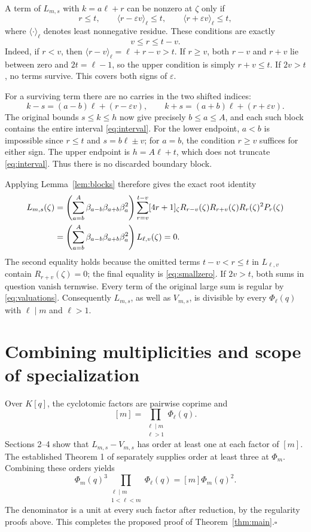 \documentclass[11pt,a4paper]{article}
\begin{document}
A term of $L_{m,s}$ with $k=a\ell+r$ can be nonzero at $\zeta$ only if
\[
 r\leq t,\qquad \langle r-\varepsilon v\rangle_\ell\leq t,
 \qquad \langle r+\varepsilon v\rangle_\ell\leq t,
\]
where $\langle\cdot\rangle_\ell$ denotes least nonnegative residue.
These conditions are exactly
\begin{equation}\label{eq:interval}
 v\leq r\leq t-v.
\end{equation}
Indeed, if $r<v$, then $\langle r-v\rangle_\ell=\ell+r-v>t$.
If $r\geq v$, both $r-v$ and $r+v$ lie between zero and $2t=\ell-1$,
so the upper condition is simply $r+v\leq t$. If $2v>t$, no terms survive.
This covers both signs of $\varepsilon$.

For a surviving term there are no carries in the two shifted indices:
\[
 k-s=(a-b)\ell+(r-\varepsilon v),\qquad
 k+s=(a+b)\ell+(r+\varepsilon v).
\]
The original bounds $s\leq k\leq h$ now give precisely $b\leq a\leq A$,
and each such block contains the entire interval \eqref{eq:interval}.
For the lower endpoint, $a<b$ is impossible since $r\leq t$ and
$s=b\ell\pm v$; for $a=b$, the condition $r\geq v$ suffices for either
sign. The upper endpoint is $h=A\ell+t$, which does not truncate
\eqref{eq:interval}. Thus there is no discarded boundary block.

Applying Lemma~\ref{lem:blocks} therefore gives the exact root identity
\begin{align}\label{eq:Lreduce}
 L_{m,s}(\zeta)
 &=\left(\sum_{a=b}^{A}\beta_{a-b}\beta_{a+b}\beta_a^2\right)
 \sum_{r=v}^{t-v}[4r+1]_\zeta
 R_{r-v}(\zeta)R_{r+v}(\zeta)R_r(\zeta)^2P_r(\zeta)\notag\\
 &=\left(\sum_{a=b}^{A}\beta_{a-b}\beta_{a+b}\beta_a^2\right)
 L_{\ell,v}(\zeta)=0.
\end{align}
The second equality holds because the omitted terms $t-v<r\leq t$
in $L_{\ell,v}$ contain $R_{r+v}(\zeta)=0$; the final equality is
\eqref{eq:smallzero}. If $2v>t$, both sums in question vanish termwise.
Every term of the original large sum is regular by \eqref{eq:valuations}.
Consequently $L_{m,s}$, as well as $V_{m,s}$, is divisible by every
$\Phi_\ell(q)$ with $\ell\mid m$ and $\ell>1$.

\section{Combining multiplicities and scope of specialization}
Over $K[q]$, the cyclotomic factors are pairwise coprime and
\[
 [m]=\prod_{\substack{\ell\mid m\\\ell>1}}\Phi_\ell(q).
\]
Sections 2--4 show that $L_{m,s}-V_{m,s}$ has order at least one at each
factor of $[m]$. The established Theorem 1 of \cite{KJ} separately supplies
order at least three at $\Phi_m$. Combining these orders yields
\[
 \Phi_m(q)^3\prod_{\substack{\ell\mid m\\1<\ell<m}}\Phi_\ell(q)
 =[m]\Phi_m(q)^2.
\]
The denominator is a unit at every such factor after reduction, by the
regularity proofs above. This completes the proposed proof of
Theorem~\ref{thm:main}.\hfill$\square$
\end{document}
